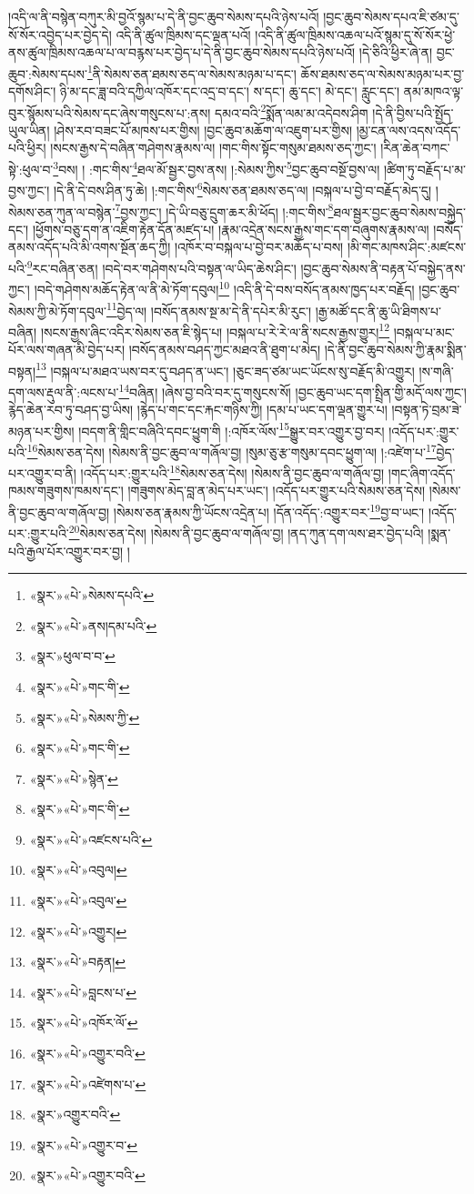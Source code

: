 །འདི་ལ་ནི་བསྙེན་བཀུར་མི་བྱའོ་སྙམ་པ་དེ་ནི་བྱང་ཆུབ་སེམས་དཔའི་ཉེས་པའོ། །བྱང་ཆུབ་སེམས་དཔའ་ཇི་ཙམ་དུ་སོ་སོར་འབྱེད་པར་བྱེད་དེ། འདི་ནི་ཚུལ་ཁྲིམས་དང་ལྡན་པའོ། །འདི་ནི་ཚུལ་ཁྲིམས་འཆལ་པའོ་སྙམ་དུ་སོ་སོར་ཕྱེ་ནས་ཚུལ་ཁྲིམས་འཆལ་པ་ལ་བརྙས་པར་བྱེད་པ་དེ་ནི་བྱང་ཆུབ་སེམས་དཔའི་ཉེས་པའོ། །དེ་ཅིའི་ཕྱིར་ཞེ་ན། བྱང་ཆུབ་:སེམས་དཔས་\footnote{«སྣར་»«པེ་»སེམས་དཔའི་}ནི་སེམས་ཅན་ཐམས་ཅད་ལ་སེམས་མཉམ་པ་དང་། ཆོས་ཐམས་ཅད་ལ་སེམས་མཉམ་པར་བྱ་དགོས་ཤིང་། ཉི་མ་དང་ཟླ་བའི་དཀྱིལ་འཁོར་དང་འདྲ་བ་དང་། ས་དང་། ཆུ་དང་། མེ་དང་། རླུང་དང་། ནམ་མཁའ་ལྟ་བུར་སྙོམས་པའི་སེམས་དང་ཞེས་གསུངས་པ་:ནས། དམའ་བའི་\footnote{«སྣར་»«པེ་»ནས།དམ་པའི་}སྨོན་ལམ་མ་འདེབས་ཤིག །དེ་ནི་བྱིས་པའི་སྤྱོད་ཡུལ་ཡིན། །ཤེས་རབ་བཟང་པོ་མཁས་པར་གྱིས། །བྱང་ཆུབ་མཆོག་ལ་འཇུག་པར་གྱིས། །མྱ་ངན་ལས་འདས་འདོད་པའི་ཕྱིར། །སངས་རྒྱས་དེ་བཞིན་གཤེགས་རྣམས་ལ། །གང་གིས་སྟོང་གསུམ་ཐམས་ཅད་ཀྱང་། །རིན་ཆེན་བཀང་སྟེ་:ཕུལ་བ་\footnote{«སྣར་»ཕུལ་བ་བ་}བས། །
:གང་གིས་\footnote{«སྣར་»«པེ་»གང་གི་}ཐལ་མོ་སྦྱར་བྱས་ནས། །:སེམས་ཀྱིས་\footnote{«སྣར་»«པེ་»སེམས་ཀྱི་}བྱང་ཆུབ་བསྔོ་བྱས་ལ། །ཚིག་ཏུ་བརྗོད་པ་མ་བྱས་ཀྱང་། །དེ་ནི་དེ་བས་ཤིན་ཏུ་ཆེ། །:གང་གིས་\footnote{«སྣར་»«པེ་»གང་གི་}སེམས་ཅན་ཐམས་ཅད་ལ། །བསྐལ་པ་བྱེ་བ་བརྗོད་མེད་དུ། །སེམས་ཅན་ཀུན་ལ་བསྙེན་\footnote{«སྣར་»«པེ་»སྙེན་}བྱས་ཀྱང་། །དེ་ཡི་བཅུ་དྲུག་ཆར་མི་ཕོད། །:གང་གིས་\footnote{«སྣར་»«པེ་»གང་གི་}ཐལ་སྦྱར་བྱང་ཆུབ་སེམས་བསྐྱེད་དང་། །ཕྱོགས་བཅུ་དག་ན་འཇིག་རྟེན་དོན་མཛད་པ། །རྣམ་འདྲེན་སངས་རྒྱས་གང་དག་བཞུགས་རྣམས་ལ། །བསོད་ནམས་འདོད་པའི་མི་འགས་སྔོན་ཆད་ཀྱི། །འཁོར་བ་བསྐལ་པ་བྱེ་བར་མཆོད་པ་བས། །མི་གང་མཁས་ཤིང་:མཛངས་པའི་\footnote{«སྣར་»«པེ་»འཛངས་པའི་}རང་བཞིན་ཅན། །བདེ་བར་གཤེགས་པའི་བསྟན་ལ་ཡིད་ཆེས་ཤིང་། །བྱང་ཆུབ་སེམས་ནི་བརྟན་པོ་བསྐྱེད་ནས་ཀྱང་། །བདེ་གཤེགས་མཆོད་རྟེན་ལ་ནི་མེ་ཏོག་དབུལ།\footnote{«སྣར་»«པེ་»འབུལ།} །འདི་ནི་དེ་བས་བསོད་ནམས་ཁྱད་པར་བརྗོད། །བྱང་ཆུབ་སེམས་ཀྱི་མེ་ཏོག་དབུལ་\footnote{«སྣར་»«པེ་»འབུལ་}བྱེད་ལ། །བསོད་ནམས་སྔ་མ་དེ་ནི་དཔེར་མི་རུང་། །རྒྱ་མཚོ་དང་ནི་ཆུ་ཡི་ཐིགས་པ་བཞིན། །སངས་རྒྱས་ཞིང་འདིར་སེམས་ཅན་ཇི་སྙེད་པ། །བསྐལ་པ་རེ་རེ་ལ་ནི་སངས་རྒྱས་གྱུར།\footnote{«སྣར་»«པེ་»འགྱུར།} །བསྐལ་པ་མང་པོར་ལས་གཞན་མི་བྱེད་པར། །བསོད་ནམས་བཤད་ཀྱང་མཐའ་ནི་ཐུག་པ་མེད། །དེ་ནི་བྱང་ཆུབ་སེམས་ཀྱི་རྣམ་སྨིན་བསྟན།\footnote{«སྣར་»«པེ་»བརྟན།} །བསྐལ་པ་མཐའ་ཡས་བར་དུ་བཤད་ན་ཡང་། །ཅུང་ཟད་ཙམ་ཡང་ཡོངས་སུ་བརྗོད་མི་འགྱུར། །ས་གཞི་དག་ལས་རྡུལ་ནི་:ལངས་པ་\footnote{«སྣར་»«པེ་»བླངས་པ་}བཞིན། །ཞེས་བྱ་བའི་བར་དུ་གསུངས་སོ། །བྱང་ཆུབ་ཡང་དག་སྤྲིན་གྱི་མདོ་ལས་ཀྱང་། རྙེད་ཆེན་རབ་ཏུ་བཤད་བྱ་ཡིས། །རྙེད་པ་གང་དང་རྐང་གཉིས་ཀྱི། །དམ་པ་ཡང་དག་ལྡན་གྱུར་པ། །བསྟན་ཏེ་བྲམ་ཟེ་མཉན་པར་གྱིས། །བདག་ནི་གླིང་བཞིའི་དབང་ཕྱུག་གི །:འཁོར་ལོས་\footnote{«སྣར་»«པེ་»འཁོར་ལོ་}སྒྱུར་བར་འགྱུར་བྱ་བར། །འདོད་པར་:གྱུར་པའི་\footnote{«སྣར་»«པེ་»འགྱུར་བའི་}སེམས་ཅན་དེས། །སེམས་ནི་བྱང་ཆུབ་ལ་གཞོལ་བྱ། །སུམ་ཅུ་རྩ་གསུམ་དབང་ཕྱུག་ལ། །:འཛེག་པ་\footnote{«སྣར་»«པེ་»འཛེགས་པ་}བྱེད་པར་འགྱུར་བ་ནི། །འདོད་པར་:གྱུར་པའི་\footnote{«སྣར་»འགྱུར་བའི་}སེམས་ཅན་དེས། །སེམས་ནི་བྱང་ཆུབ་ལ་གཞོལ་བྱ། །གང་ཞིག་འདོད་ཁམས་གཟུགས་ཁམས་དང་། །གཟུགས་མེད་བླ་ན་མེད་པར་ཡང་། །འདོད་པར་གྱུར་པའི་སེམས་ཅན་དེས། །སེམས་ནི་བྱང་ཆུབ་ལ་གཞོལ་བྱ། །སེམས་ཅན་རྣམས་ཀྱི་ཡོངས་འདྲེན་པ། །དོན་འདོད་:འགྱུར་བར་\footnote{«སྣར་»«པེ་»འགྱུར་བ་}བྱ་བ་ཡང་། །འདོད་པར་:གྱུར་པའི་\footnote{«སྣར་»«པེ་»འགྱུར་བའི་}སེམས་ཅན་དེས། །སེམས་ནི་བྱང་ཆུབ་ལ་གཞོལ་བྱ། །ནད་ཀུན་དག་ལས་ཐར་བྱེད་པའི། །སྨན་པའི་རྒྱལ་པོར་འགྱུར་བར་བྱ། །
